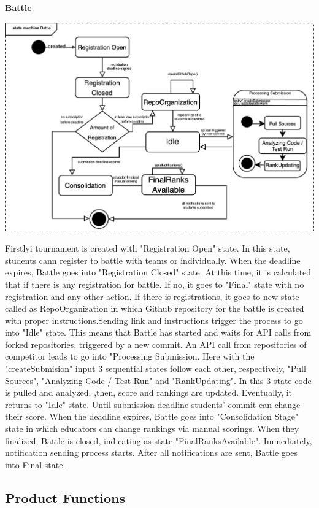 \textbf{Battle}\newline
\begin{center}
    \includegraphics[scale=0.2]{Images/battleStatechart.jpeg}
\end{center}
Firstlyi tournament is created with "Registration Open" state. In this state, students cann register to battle with teams or individually. When the deadline expires, Battle goes into "Registration Closed" state. At this time, it is calculated that if there is any registration for battle. If no, it goes to "Final" state with no registration and any other action. If there is registrations, it goes to new state called as RepoOrganization in which Github repository for the battle is created with proper instructions.Sending link and instructions trigger the process to go into "Idle" state. This means that Battle has started and waits for API calls from forked repositories, triggered by a new commit. An API call from  repositories of competitor leads to go into "Processing Submission. Here with the "createSubmision" input 3 sequential states follow each other, respectively, "Pull Sources", "Analyzing Code / Test Run" and "RankUpdating". In this 3 state code is pulled and analyzed. ,then, score and rankings are updated.  Eventually, it returns to "Idle" state. Until submission deadline students' commit can change their score. When the deadline expires, Battle goes into "Consolidation Stage" state in which educators can change rankings via manual scorings. When they finalized, Battle is closed, indicating as state "FinalRanksAvailable". Immediately, notification sending process starts. After all notifications are sent, Battle goes into Final state.
\newpage
\subsection{Product Functions}
